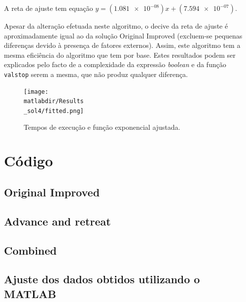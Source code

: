 \documentclass[portuguese,11pt,a4paper,titlepage]{article}
\newcommand{\extrang}[1]{\textit{#1}}
\newcommand{\srcdir}{..}
\newcommand{\matlabdir}{"../MATLAB-fittings"}
\begin{document}
A reta de ajuste tem equação \begin{math}y=(\num{1.081e-08})x+(\num{7.594e-07})\end{math}.

Apesar da alteração efetuada neste algoritmo, o decive da reta de ajuste é aproximadamente igual ao da
solução Original Improved (excluem-se pequenas diferenças devido à presença de fatores externos).
Assim, este algoritmo tem a mesma eficiência do algoritmo que tem por base.
Estes resultados podem ser explicados pelo facto de a complexidade da expressão \extrang{boolean}
e da função \verb#valstop# serem a mesma, que não produz qualquer diferença.

\begin{figure}[h]
	\centering
	\texttt{[image: \\matlabdir/Results\\\_sol4/fitted.png]}
	\caption{Tempos de execução e função exponencial ajustada.}
	\label{fig:sol4}
\end{figure}
\pagebreak

\section{Código}
\subsection{Original Improved}

\pagebreak
\subsection{Advance and retreat}

\pagebreak
\subsection{Combined}

\pagebreak
\subsection{Ajuste dos dados obtidos utilizando o MATLAB}

\end{document}
